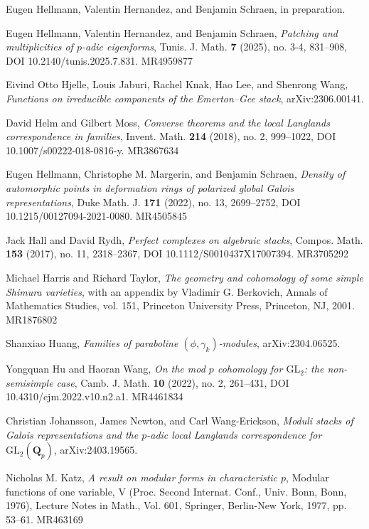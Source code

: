 \item[{[HHS]}] Eugen Hellmann, Valentin Hernandez, and Benjamin Schraen, in preparation.
\item[{[HHS25]}] Eugen Hellmann, Valentin Hernandez, and Benjamin Schraen, \emph{Patching and multiplicities of $p$-adic eigenforms}, Tunis. J. Math. \textbf{7} (2025), no. 3-4, 831--908, DOI 10.2140/tunis.2025.7.831. MR4959877
\item[{[HJK+24]}] Eivind Otto Hjelle, Louis Jaburi, Rachel Knak, Hao Lee, and Shenrong Wang, \emph{Functions on irreducible components of the Emerton--Gee stack}, arXiv:2306.00141.
\item[{[HM18]}] David Helm and Gilbert Moss, \emph{Converse theorems and the local Langlands correspondence in families}, Invent. Math. \textbf{214} (2018), no. 2, 999--1022, DOI 10.1007/s00222-018-0816-y. MR3867634
\item[{[HMS22]}] Eugen Hellmann, Christophe M. Margerin, and Benjamin Schraen, \emph{Density of automorphic points in deformation rings of polarized global Galois representations}, Duke Math. J. \textbf{171} (2022), no. 13, 2699--2752, DOI 10.1215/00127094-2021-0080. MR4505845
\item[{[HR17]}] Jack Hall and David Rydh, \emph{Perfect complexes on algebraic stacks}, Compos. Math. \textbf{153} (2017), no. 11, 2318--2367, DOI 10.1112/S0010437X17007394. MR3705292
\item[{[HT01]}] Michael Harris and Richard Taylor, \emph{The geometry and cohomology of some simple Shimura varieties}, with an appendix by Vladimir G. Berkovich, Annals of Mathematics Studies, vol. 151, Princeton University Press, Princeton, NJ, 2001. MR1876802
\item[{[Hua23]}] Shanxiao Huang, \emph{Families of paraboline $(\phi,\gamma_k)$-modules}, arXiv:2304.06525.
\item[{[HW22]}] Yongquan Hu and Haoran Wang, \emph{On the mod $p$ cohomology for $\mathrm{GL}_2$: the non-semisimple case}, Camb. J. Math. \textbf{10} (2022), no. 2, 261--431, DOI 10.4310/cjm.2022.v10.n2.a1. MR4461834
\item[{[JNWE24]}] Christian Johansson, James Newton, and Carl Wang-Erickson, \emph{Moduli stacks of Galois representations and the $p$-adic local Langlands correspondence for $\mathrm{GL}_2(\mathbf{Q}_p)$}, arXiv:2403.19565.
\item[{[Kat77]}] Nicholas M. Katz, \emph{A result on modular forms in characteristic $p$}, Modular functions of one variable, V (Proc. Second Internat. Conf., Univ. Bonn, Bonn, 1976), Lecture Notes in Math., Vol. 601, Springer, Berlin-New York, 1977, pp. 53--61. MR463169
